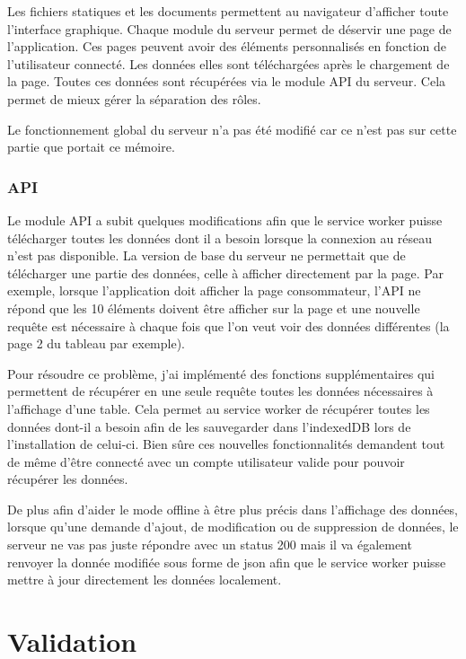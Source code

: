 \documentclass{EPL-master-thesis-covers-FR}
\begin{document}
				Les fichiers statiques et les documents permettent au navigateur d'afficher toute l'interface graphique. Chaque module du serveur permet de déservir une page de l'application. Ces pages peuvent avoir des éléments personnalisés en fonction de l'utilisateur connecté. Les données elles sont téléchargées après le chargement de la page. Toutes ces données sont récupérées via le module API du serveur. Cela permet de mieux gérer la séparation des rôles. 		
				
				Le fonctionnement global du serveur n'a pas été modifié car ce n'est pas sur cette partie que portait ce mémoire.
				
			\subsection*{API}
				\label{sec:api}
				Le module API a subit quelques modifications afin que le service worker puisse télécharger toutes les données dont il a besoin lorsque la connexion au réseau n'est pas disponible. La version de base du serveur ne permettait que de télécharger une partie des données, celle à afficher directement par la page. Par exemple, lorsque l'application doit afficher la page consommateur, l'API ne répond que les 10 éléments doivent être afficher sur la page et une nouvelle requête est nécessaire à chaque fois que l'on veut voir des données différentes (la page 2 du tableau par exemple).
				
				Pour résoudre ce problème, j'ai implémenté des fonctions supplémentaires qui permettent de récupérer en une seule requête toutes les données nécessaires à l'affichage d'une table. Cela permet au service worker de récupérer toutes les données dont-il a besoin afin de les sauvegarder dans l'indexedDB lors de l'installation de celui-ci. Bien sûre ces nouvelles fonctionnalités demandent tout de même d'être connecté avec un compte utilisateur valide pour pouvoir récupérer les données.
				
				De plus afin d'aider le mode offline à être plus précis dans l'affichage des données, lorsque qu'une demande d'ajout, de modification ou de suppression de données, le serveur ne vas pas juste répondre avec un status 200 mais il va également renvoyer la donnée modifiée sous forme de json afin que le service worker puisse mettre à jour directement les données localement.
			

	\chapter{Validation}
\end{document}
